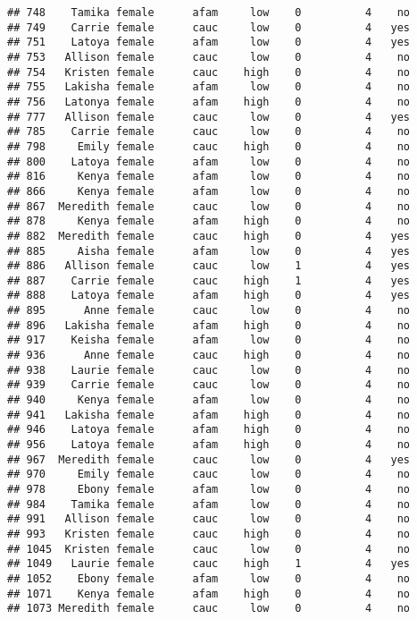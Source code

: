 \documentclass[
]{article}
\begin{document}
\begin{verbatim}
## 748    Tamika female      afam     low    0          4    no
## 749    Carrie female      cauc     low    0          4   yes
## 751    Latoya female      afam     low    0          4   yes
## 753   Allison female      cauc     low    0          4    no
## 754   Kristen female      cauc    high    0          4    no
## 755   Lakisha female      afam     low    0          4    no
## 756   Latonya female      afam    high    0          4    no
## 777   Allison female      cauc     low    0          4   yes
## 785    Carrie female      cauc     low    0          4    no
## 798     Emily female      cauc    high    0          4    no
## 800    Latoya female      afam     low    0          4    no
## 816     Kenya female      afam     low    0          4    no
## 866     Kenya female      afam     low    0          4    no
## 867  Meredith female      cauc     low    0          4    no
## 878     Kenya female      afam    high    0          4    no
## 882  Meredith female      cauc    high    0          4   yes
## 885     Aisha female      afam     low    0          4   yes
## 886   Allison female      cauc     low    1          4   yes
## 887    Carrie female      cauc    high    1          4   yes
## 888    Latoya female      afam    high    0          4   yes
## 895      Anne female      cauc     low    0          4    no
## 896   Lakisha female      afam    high    0          4    no
## 917    Keisha female      afam     low    0          4    no
## 936      Anne female      cauc    high    0          4    no
## 938    Laurie female      cauc     low    0          4    no
## 939    Carrie female      cauc     low    0          4    no
## 940     Kenya female      afam     low    0          4    no
## 941   Lakisha female      afam    high    0          4    no
## 946    Latoya female      afam    high    0          4    no
## 956    Latoya female      afam    high    0          4    no
## 967  Meredith female      cauc     low    0          4   yes
## 970     Emily female      cauc     low    0          4    no
## 978     Ebony female      afam     low    0          4    no
## 984    Tamika female      afam     low    0          4    no
## 991   Allison female      cauc     low    0          4    no
## 993   Kristen female      cauc    high    0          4    no
## 1045  Kristen female      cauc     low    0          4    no
## 1049   Laurie female      cauc    high    1          4   yes
## 1052    Ebony female      afam     low    0          4    no
## 1071    Kenya female      afam    high    0          4    no
## 1073 Meredith female      cauc     low    0          4    no

\end{verbatim}
\end{document}
